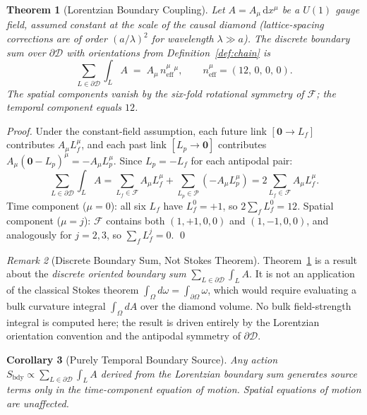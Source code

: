 \documentclass[12pt, a4paper]{article}
\theoremstyle{plain}
\newtheorem{theorem}{Theorem}[section]
\newtheorem{corollary}[theorem]{Corollary}
\theoremstyle{definition}
\theoremstyle{remark}
\newtheorem{remark}[theorem]{Remark}
\newcommand{\BdyCD}{\partial\mathscr{D}}
\newcommand{\FS}{\mathcal{F}}
\newcommand{\PS}{\mathcal{P}}
\newcommand{\neff}{n^\mu_{\mathrm{eff}}}
\begin{document}
\begin{theorem}[Lorentzian Boundary Coupling]\label{thm:boundary}
Let $A = A_\mu\,\mathrm{d}x^\mu$ be a $U(1)$ gauge field,
assumed constant at the scale of the causal diamond
(lattice-spacing corrections are of order $(a/\lambda)^2$
for wavelength $\lambda\gg a$).
The discrete boundary sum over $\BdyCD$ with orientations
from Definition~\ref{def:chain} is
\[
  \sum_{L\in\BdyCD} \int_L A
  \;=\; A_\mu\,\neff{}^\mu,
  \qquad \neff = (12,\,0,\,0,\,0).
\]
The spatial components vanish by the six-fold rotational symmetry
of $\FS$; the temporal component equals $12$.
\end{theorem}

\begin{proof}
Under the constant-field assumption, each future link
$[\bm{0}\to L_f]$ contributes $A_\mu L_f^\mu$, and each
past link $[L_p\to\bm{0}]$ contributes $A_\mu(\bm{0}-L_p)^\mu
= -A_\mu L_p^\mu$.
Since $L_p = -L_f$ for each antipodal pair:
\[
  \sum_{L\in\BdyCD}\int_L A
  = \sum_{L_f\in\FS} A_\mu L_f^\mu
  + \sum_{L_p\in\PS}(-A_\mu L_p^\mu)
  = 2\sum_{L_f\in\FS} A_\mu L_f^\mu.
\]
Time component ($\mu=0$): all six $L_f$ have $L_f^0=+1$,
so $2\sum_f L_f^0 = 12$.
Spatial component ($\mu=j$): $\FS$ contains both
$(1,+1,0,0)$ and $(1,-1,0,0)$, and analogously for $j=2,3$,
so $\sum_f L_f^j = 0$.
\qed
\end{proof}

\begin{remark}[Discrete Boundary Sum, Not Stokes Theorem]\label{rem:stokes}
Theorem~\ref{thm:boundary} is a result about the
\emph{discrete oriented boundary sum}
$\sum_{L\in\BdyCD}\int_L A$.
It is not an application of the classical Stokes theorem
$\int_\Omega d\omega = \int_{\partial\Omega}\omega$,
which would require evaluating a bulk curvature integral
$\int_\Omega dA$ over the diamond volume.
No bulk field-strength integral is computed here; the result
is driven entirely by the Lorentzian orientation convention
and the antipodal symmetry of $\BdyCD$.
\end{remark}

\begin{corollary}[Purely Temporal Boundary Source]\label{cor:temporal}
Any action $S_\mathrm{bdy} \propto \sum_{L\in\BdyCD}\int_L A$
derived from the Lorentzian boundary sum generates source terms
only in the time-component equation of motion.
Spatial equations of motion are unaffected.
\end{corollary}

\end{document}
